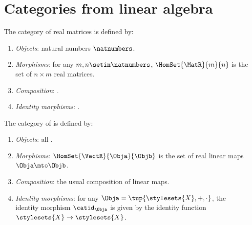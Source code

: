 
\section[Categories from linear algebra]{Categories from linear algebra}
\label{sec:cats-of-linear-algebra}

\begin{ctdefinition}
    \label{def:cat-of-real-matrices}
    The category \MatR of real matrices is defined by:
    \begin{enumerate}
        \item \emph{Objects}: natural numbers $\natnumbers$.
        \item \emph{Morphisms}: for any $m, n \setin \natnumbers$, $\HomSet{\MatR}{m}{n}$ is the set  of $n \times m$ real matrices.
        \item \emph{Composition}: .
        \item \emph{Identity morphisms}: .
    \end{enumerate}
\end{ctdefinition}

\begin{ctdefinition}
    \label{def:cat-of-real-vector-spaces}
    The category \VectR of  is defined by:
    \begin{enumerate}
        \item \emph{Objects}: all .
        \item \emph{Morphisms}: $\HomSet{\VectR}{\Obja}{\Objb}$ is the set of real linear maps $\Obja \mto \Objb$.
        \item \emph{Composition}: the usual composition of linear maps.
        \item \emph{Identity morphisms}: for any  $\Obja = \tup{\stylesets{X}, +,{{ \cdot}}}$, the identity morphism $\catid_\Obja$ is given by the identity function $\stylesets{X} \to \stylesets{X}$.
    \end{enumerate}
\end{ctdefinition}

